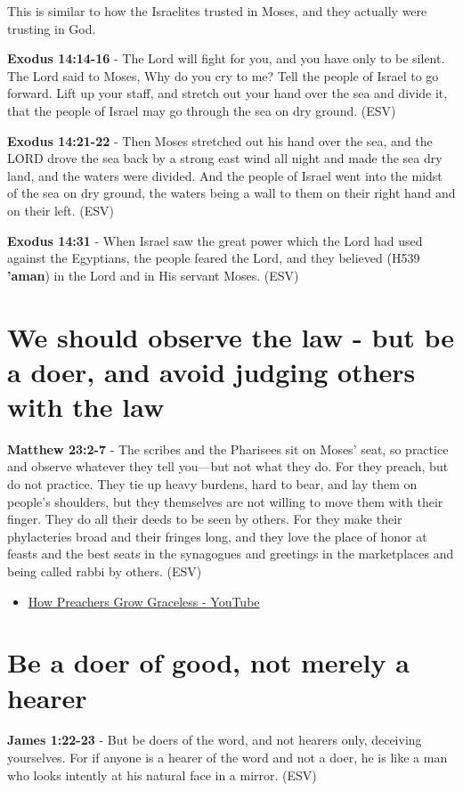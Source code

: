 \documentclass[11pt]{article}
\begin{document}
This is similar to how the Israelites trusted in Moses, and they actually were trusting in God.

\textbf{Exodus 14:14-16} - The Lord will fight for you, and you have only to be silent.  The Lord said to Moses, Why do you cry to me? Tell the people of Israel to go forward.  Lift up your staff, and stretch out your hand over the sea and divide it, that the people of Israel may go through the sea on dry ground. (ESV)

\textbf{Exodus 14:21-22} - Then Moses stretched out his hand over the sea, and the LORD drove the sea back by a strong east wind all night and made the sea dry land, and the waters were divided. And the people of Israel went into the midst of the sea on dry ground, the waters being a wall to them on their right hand and on their left. (ESV)

\textbf{Exodus 14:31} - When Israel saw the great power which the Lord had used against the Egyptians, the people feared the Lord, and they believed (H539 \textbf{'aman}) in the Lord and in His servant Moses. (ESV)

\section{We should observe the law - but be a doer, and avoid judging others with the law}
\label{sec:org6734d57}
\textbf{Matthew 23:2-7} - The scribes and the Pharisees sit on Moses' seat, so practice and observe whatever they tell you—but not what they do. For they preach, but do not practice. They tie up heavy burdens, hard to bear, and lay them on people's shoulders, but they themselves are not willing to move them with their finger. They do all their deeds to be seen by others. For they make their phylacteries broad and their fringes long, and they love the place of honor at feasts and the best seats in the synagogues and greetings in the marketplaces and being called rabbi by others. (ESV)

\begin{itemize}
\item \href{https://www.youtube.com/watch?v=alOI2zxIPgc}{How Preachers Grow Graceless - YouTube}
\end{itemize}

\section{Be a doer of good, not merely a hearer}
\label{sec:orga391d40}
\textbf{James 1:22-23} -  But be doers of the word, and not hearers only, deceiving yourselves. For if anyone is a hearer of the word and not a doer, he is like a man who looks intently at his natural face in a mirror. (ESV)
\end{document}
